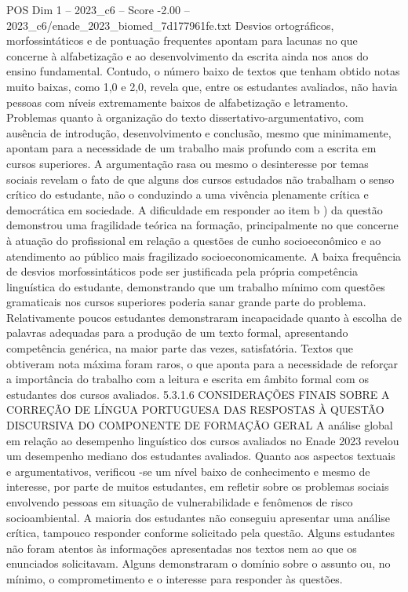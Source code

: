 \begin{textsample}{POS Dim 1 – 2023\_c6 – Score -2.00 – 2023\_c6/enade\_2023\_biomed\_7d177961fe.txt}
Desvios ortográficos, morfossintáticos e de pontuação frequentes apontam para lacunas no que concerne à alfabetização e ao desenvolvimento da escrita ainda nos anos do ensino fundamental.
Contudo, o número baixo de textos que tenham obtido notas muito baixas, como 1,0 e 2,0, revela que, entre os estudantes avaliados, não havia pessoas com níveis extremamente baixos de alfabetização e letramento.
Problemas quanto à organização do texto dissertativo-argumentativo, com ausência de introdução, desenvolvimento e conclusão, mesmo que minimamente, apontam para a necessidade de um trabalho mais profundo com a escrita em cursos superiores.
A argumentação rasa ou mesmo o desinteresse por temas sociais revelam o fato de que alguns dos cursos estudados não trabalham o senso crítico do estudante, não o conduzindo a uma vivência plenamente crítica e democrática em sociedade.
A dificuldade em responder ao item b ) da questão demonstrou uma fragilidade teórica na formação, principalmente no que concerne à atuação do profissional em relação a questões de cunho socioeconômico e ao atendimento ao público mais fragilizado socioeconomicamente.
A baixa frequência de desvios morfossintáticos pode ser justificada pela própria competência linguística do estudante, demonstrando que um trabalho mínimo com questões gramaticais nos cursos superiores poderia sanar grande parte do problema.
Relativamente poucos estudantes demonstraram incapacidade quanto à escolha de palavras adequadas para a produção de um texto formal, apresentando competência genérica, na maior parte das vezes, satisfatória.
Textos que obtiveram nota máxima foram raros, o que aponta para a necessidade de reforçar a importância do trabalho com a leitura e escrita em âmbito formal com os estudantes dos cursos avaliados. 5.3.1.6 CONSIDERAÇÕES FINAIS SOBRE A CORREÇÃO DE LÍNGUA PORTUGUESA DAS RESPOSTAS À QUESTÃO DISCURSIVA DO COMPONENTE DE FORMAÇÃO GERAL A análise global em relação ao desempenho linguístico dos cursos avaliados no Enade 2023 revelou um desempenho mediano dos estudantes avaliados.
Quanto aos aspectos textuais e argumentativos, verificou -se um nível baixo de conhecimento e mesmo de interesse, por parte de muitos estudantes, em refletir sobre os problemas sociais envolvendo pessoas em situação de vulnerabilidade e fenômenos de risco socioambiental.
A maioria dos estudantes não conseguiu apresentar uma análise crítica, tampouco responder conforme solicitado pela questão.
Alguns estudantes não foram atentos às informações apresentadas nos textos nem ao que os enunciados solicitavam.
Alguns demonstraram o domínio sobre o assunto ou, no mínimo, o comprometimento e o interesse para responder às questões.

\end{textsample}
